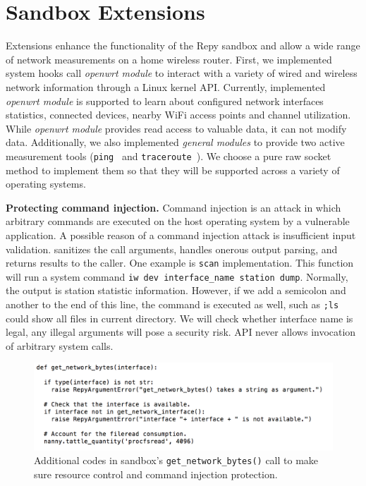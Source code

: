 \section{Sandbox Extensions}
\label{sec.extensions}
Extensions enhance the functionality of the Repy sandbox and allow a wide range of network measurements on a home wireless router. First, we implemented system hooks call \textit{openwrt module} to interact with a variety of wired and wireless network information through a Linux kernel API. Currently, implemented \textit{openwrt module} is supported to learn about configured network interfaces statistics, connected devices, nearby WiFi access points and channel utilization. While \textit{openwrt module} provides read access to valuable data, it can not modify data. Additionally, we also implemented \textit{general modules} to provide two active measurement tools (\texttt{ping}~\cite{pingcode} and \texttt{traceroute}~\cite{traceroutecode}). We choose a pure raw socket method to implement them so that they will be supported across a variety of operating systems. 

\textbf{Protecting command injection.} Command injection is an attack in which arbitrary commands are executed on the host operating system by a vulnerable application. A possible reason of a command injection attack is insufficient input validation. \sysname sanitizes the call arguments, handles onerous output parsing, and returns results to the caller. One example is \texttt{scan} implementation. This function will run a system command \texttt{iw dev interface\_name station dump}. Normally, the output is station statistic information. However, if we add a semicolon and another to the end of this line, the command is executed as well, such as \texttt{;ls} could show all files in current directory. We will check whether interface name is legal, any illegal arguments will pose a security risk. \sysname API never allows invocation of arbitrary system calls.

\begin{figure}%
\centering
\includegraphics[width=0.8\columnwidth]{figure/nanny.png}
\caption{Additional codes in \sysname sandbox's \texttt{get\_network\_bytes()} call to make sure resource control and command injection protection.}
\label{fig-nanny}
\end{figure}


